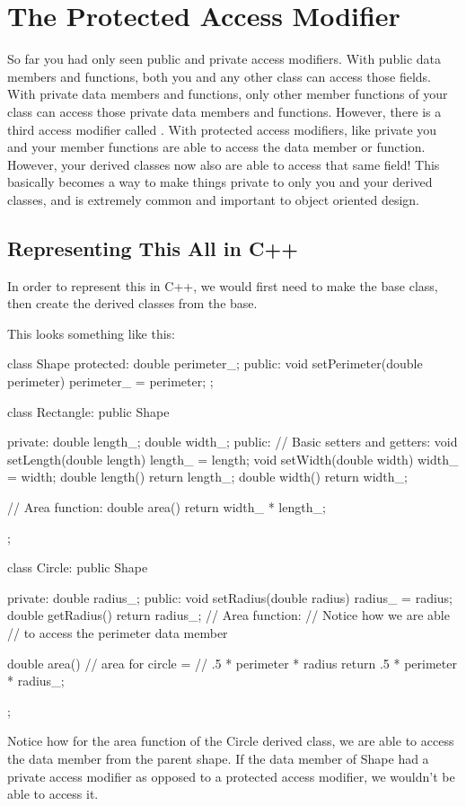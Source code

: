 \documentclass{tufte-handout}
\begin{document}
\section{The Protected Access Modifier}
So far you had only seen public and private access modifiers.
With public data members and functions, both you and any other class can access those fields.
With private data members and functions, only other member functions of your class can access those private data members and functions.
However, there is a third access modifier called .
With protected access modifiers, like private you and your member functions are able to access the data member or function.
However, your derived classes now also are able to access that same field!
This basically becomes a way to make things private to only you and your derived classes, and is extremely common and important to object oriented design.

\subsection{Representing This All in C++}
In order to represent this in C++, we would first need to make the  base class, then create the derived classes from the  base.

This looks something like this:

\begin{Code}
class Shape{
    protected:
        double perimeter_;
    public:
        void setPerimeter(double perimeter){
            perimeter_ = perimeter;
        }
};

class Rectangle: public Shape {
    private:
        double length_;
        double width_;
    public:
        // Basic setters and getters:
        void setLength(double length){
            length_ = length;
        }
        void setWidth(double width){
            width_ = width;
        }
        double length(){
            return length_;
        }
        double width(){
            return width_;
        }
        
        // Area function:
        double area(){
            return width_ * length_;
        }
        
};

class Circle: public Shape {
    private:
        double radius_;
    public:
        void setRadius(double radius){
            radius_ = radius;
        }
        double getRadius(){
            return radius_;
        }
        // Area function:
        // Notice how we are able
        // to access the perimeter data member
        
        double area(){
            // area for circle = 
            // .5 * perimeter * radius
            return .5 * perimeter * radius_;
        }
};
            
\end{Code}
Notice how for the area function of the Circle derived class, we are able to access the  data member from the parent shape.
If the  data member of Shape had a private access modifier as opposed to a protected access modifier, we wouldn't be able to access it.
\end{document}
